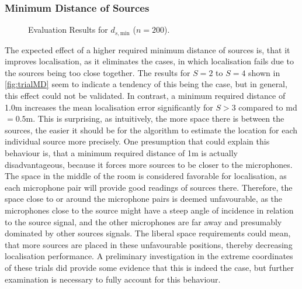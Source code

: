 \subsubsection*{Minimum Distance of Sources}

\begin{figure}[H]
\iftoggle{quick}{%
    \texttt{[image: plots/boxplots/boxplot-joined-md]}
}{%
    
}
	\caption[Evaluation Results for $d_{s,\text{min}}$]{Evaluation Results for $d_{s,\text{min}}$ ($n=200$).}
	\label{fig:trialMD}
\end{figure}
The expected effect of a higher required minimum distance of sources is, that it improves localisation, as it eliminates the cases, in which localisation fails due to the sources being too close together. The results for $S=2$ to $S=4$ shown in \autoref{fig:trialMD} seem to indicate a tendency of this being the case, but in general, this effect could not be validated. In contrast, a minimum required distance of 1.0m increases the mean localisation error significantly for $S>3$ compared to md$=0.5$m. This is surprising, as intuitively, the more space there is between the sources, the easier it should be for the algorithm to estimate the location for each individual source more precisely. One presumption that could explain this behaviour is, that a minimum required distance of 1m is actually disadvantageous, because it forces more sources to be closer to the microphones. The space in the middle of the room is considered favorable for localisation, as each microphone pair will provide good readings of sources there. Therefore, the space close to or around the microphone pairs is deemed unfavourable, as the microphones close to the source might have a steep angle of incidence in relation to the source signal, and the other microphones are far away and presumably dominated by other sources signals. The liberal space requirements could mean, that more sources are placed in these unfavourable positions, thereby decreasing localisation performance. A preliminary investigation in the extreme coordinates of these trials did provide some evidence that this is indeed the case, but further examination is necessary to fully account for this behaviour.